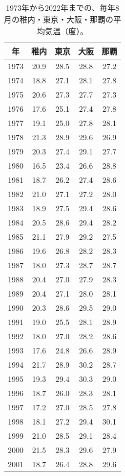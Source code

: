 \documentclass[a4paper, platex, dvipdfmx]{jsarticle}
\begin{document}
\begin{table}
  \centering
  \caption{1973年から2022年までの、毎年8月の稚内・東京・大阪・那覇の平均気温（度）。}
  \begin{tabular}{ccccc}
    \hline
    年 & 稚内 & 東京 & 大阪 & 那覇 \\\hline
    1973 & 20.9 & 28.5 & 28.8 & 27.2  \\
    1974 & 18.8 & 27.1 & 28.1 & 27.8  \\
    1975 & 20.6 & 27.3 & 27.7 & 27.3  \\
    1976 & 17.6 & 25.1 & 27.4 & 27.8  \\
    1977 & 19.1 & 25.0 & 27.8 & 28.1  \\
    1978 & 21.3 & 28.9 & 29.6 & 26.9  \\
    1979 & 20.3 & 27.4 & 29.1 & 27.7  \\
    1980 & 16.5 & 23.4 & 26.6 & 28.8  \\
    1981 & 18.7 & 26.2 & 27.4 & 28.6  \\
    1982 & 21.0 & 27.1 & 27.2 & 28.0  \\
    1983 & 18.9 & 27.5 & 29.4 & 28.6  \\
    1984 & 20.5 & 28.6 & 29.4 & 28.2  \\
    1985 & 21.1 & 27.9 & 29.2 & 27.5  \\
    1986 & 19.6 & 26.8 & 28.2 & 28.3  \\
    1987 & 18.0 & 27.3 & 28.7 & 28.7  \\
    1988 & 20.4 & 27.0 & 27.9 & 28.3  \\
    1989 & 20.4 & 27.1 & 28.0 & 28.1  \\
    1990 & 20.3 & 28.6 & 29.5 & 29.0  \\
    1991 & 19.0 & 25.5 & 28.1 & 28.9  \\
    1992 & 18.0 & 27.0 & 28.2 & 28.6  \\
    1993 & 17.6 & 24.8 & 26.6 & 28.9  \\
    1994 & 21.7 & 28.9 & 30.2 & 28.7  \\
    1995 & 19.3 & 29.4 & 30.3 & 29.0  \\
    1996 & 18.7 & 26.0 & 28.3 & 28.1  \\
    1997 & 17.2 & 27.0 & 28.5 & 27.8  \\
    1998 & 18.1 & 27.2 & 29.4 & 30.1  \\
    1999 & 21.0 & 28.5 & 29.1 & 28.4  \\
    2000 & 21.5 & 28.3 & 29.6 & 27.9  \\
    2001 & 18.7 & 26.4 & 28.8 & 29.6  \\

\end{tabular}
\end{table}
\end{document}
